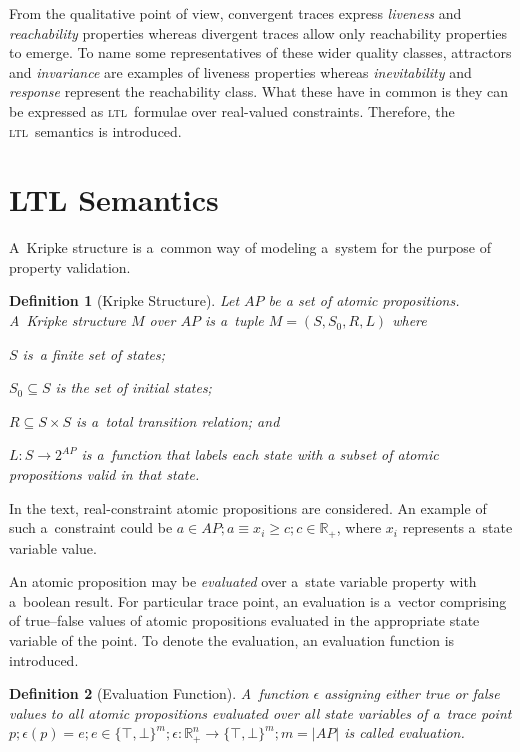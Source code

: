 \documentclass[12pt,twoside,draft]{fithesis}
\newcommand{\ltl}{\textsc{ltl}~}
\newcommand{\mReal}{\mathbb{R}}
\newtheorem{mydef}{Definition}
\begin{document}
From the qualitative point of view, convergent traces express
\emph{liveness} and \emph{reachability} properties whereas
divergent traces allow only reachability properties to emerge.
To name some representatives of these wider quality classes,
attractors and  \emph{invariance} are examples of liveness
properties whereas \emph{inevitability} and \emph{response} represent
the reachability class\cite{rizk}. What these have in common is they
can be expressed as \ltl formulae over real-valued
constraints\cite{sven}. Therefore, the \ltl semantics is introduced.

\section{LTL Semantics}
A~Kripke structure is a~common way of modeling a~system for the purpose
of property validation\cite{clarke}.
\begin{mydef}[Kripke Structure]
Let ${AP}$ be a set of atomic propositions.
A~Kripke structure\cite{clarke} $M$ over $AP$ is a~tuple
$M=(S, S_0, R, L)$ where
\begin{inparaenum}
	\item{}$S$ is~a finite set of states;
	\item{}$S_0\subseteq{}S$ is the set of initial states;
	\item{}$R\subseteq{}S\times{}S$ is a~total transition relation; and
	\item{}$L:S\rightarrow{}2^{AP}$ is a~function that labels each state
		with a subset of atomic propositions valid in that state.
\end{inparaenum}
\end{mydef}
In the text, real-constraint atomic propositions are considered.
An example of such a~constraint could be
$a\in AP;a\equiv x_i \geq c;c\in\mReal_{+}$, where $x_i$ represents
a~state variable value.

An atomic proposition may be \emph{evaluated}
over a~state variable property with a~boolean result. For particular
trace point, an evaluation is a~vector comprising of true--false values
of atomic propositions evaluated in the appropriate state variable of
the point. To denote the evaluation, an evaluation function is
introduced.
\begin{mydef}[Evaluation Function]
A~function $\epsilon$ assigning either true or false values to
all atomic propositions evaluated over all state variables of a~trace
point $p;\epsilon(p)=e;e\in\{\top,\bot\}^m; \epsilon:\mReal_{+}^n
\rightarrow\{\top,\bot\}^m;m=|AP|$ is called evaluation.
\end{mydef}
\end{document}
